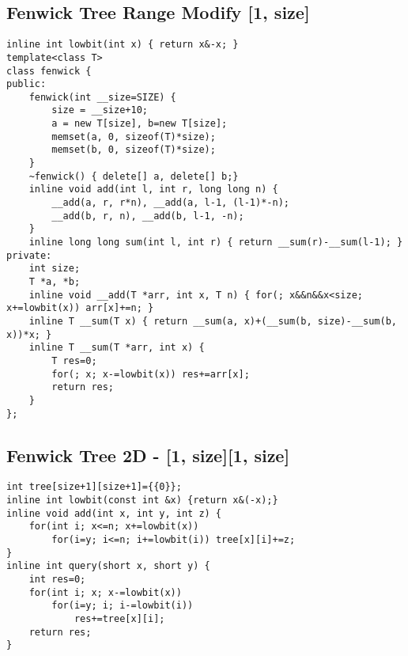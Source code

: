 \documentclass[11pt,twocolumn,a4paper]{article}
\begin{document}
\subsection{Fenwick Tree Range Modify [1, size]}
\begin{lstlisting}[label=Fenwick Tree Range Modify]
inline int lowbit(int x) { return x&-x; }
template<class T>
class fenwick {
public:
	fenwick(int __size=SIZE) {
		size = __size+10;
		a = new T[size], b=new T[size];
		memset(a, 0, sizeof(T)*size);
		memset(b, 0, sizeof(T)*size);
	}
	~fenwick() { delete[] a, delete[] b;}
	inline void add(int l, int r, long long n) {
		__add(a, r, r*n), __add(a, l-1, (l-1)*-n);
		__add(b, r, n), __add(b, l-1, -n);
	}
	inline long long sum(int l, int r) { return __sum(r)-__sum(l-1); }
private:
	int size;
	T *a, *b;
	inline void __add(T *arr, int x, T n) { for(; x&&n&&x<size; x+=lowbit(x)) arr[x]+=n; }
	inline T __sum(T x) { return __sum(a, x)+(__sum(b, size)-__sum(b, x))*x; }
	inline T __sum(T *arr, int x) {
		T res=0;
		for(; x; x-=lowbit(x)) res+=arr[x];
		return res;
	}
};
\end{lstlisting}

\subsection{Fenwick Tree 2D - [1, size][1, size]}
\begin{lstlisting}[label=Fenwick Tree 2D]
int tree[size+1][size+1]={{0}};
inline int lowbit(const int &x) {return x&(-x);}
inline void add(int x, int y, int z) {
	for(int i; x<=n; x+=lowbit(x))
		for(i=y; i<=n; i+=lowbit(i)) tree[x][i]+=z;
}
inline int query(short x, short y) {
	int res=0;
	for(int i; x; x-=lowbit(x))
		for(i=y; i; i-=lowbit(i))
			res+=tree[x][i];
	return res;
}
\end{lstlisting}
\end{document}
